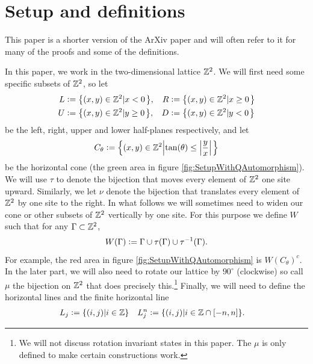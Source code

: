 \documentclass[11pt,a4paper,twoside]{article}
\numberwithin{equation}{section}
\begin{document}
	\section{Setup and definitions}\label{sec:Setup}
	\begin{remark}
		This paper is a shorter version of the ArXiv paper \cite{jappens2023spt} and will often refer to it for many of the proofs and some of the definitions.
	\end{remark}
	In this paper, we work in the two-dimensional lattice $\mathbb Z^2$. We will first need some specific subsets of $\mathbb Z^2$, so let
	\begin{align}
		L&\defeq \left\{(x,y)\in\ZZ^2\left|x<0\right.\right\},&R&\defeq \left\{(x,y)\in\ZZ^2\left|x\geq 0\right.\right\}\\
		U&\defeq \left\{(x,y)\in\ZZ^2\left|y\geq 0\right.\right\},&D&\defeq \left\{(x,y)\in\ZZ^2\left|y<0\right.\right\}
	\end{align}
	be the left, right, upper and lower half-planes respectively, and let
	\begin{equation}
		C_\theta\defeq \left\{(x,y)\in\ZZ^2\left|\tan(\theta)\leq\abs{\frac{y}{x}}\right.\right\}
	\end{equation}
	be the horizontal cone (the green area in figure \ref{fig:SetupWithQAutomorphism}). We will use $\tau$ to denote the bijection that moves every element of $\mathbb Z^2$ one site upward. Similarly, we let $\nu$ denote the bijection that translates every element of $\mathbb Z^2$ by one site to the right. In what follows we will sometimes need to widen our cone or other subsets of $\mathbb Z^2$ vertically by one site. For this purpose we define $W$ such that for any $\Gamma\subset\mathbb Z^2$,
	\begin{equation}
		W(\Gamma)\vcentcolon= \Gamma\cup\tau(\Gamma)\cup\tau^{-1}(\Gamma).
	\end{equation}
	For example, the red area in figure \ref{fig:SetupWithQAutomorphism} is $W(C_\theta)^c$. In the later part, we will also need to rotate our lattice by $90^\circ$ (clockwise) so call $\mu$ the bijection on $\mathbb Z^2$ that does precisely this.\footnote{We will not discuss rotation invariant states in this paper. The $\mu$ is only defined to make certain constructions work.} Finally, we will need to define the horizontal lines and the finite horizontal line
	\begin{align}
		L_j&\vcentcolon= \{(i,j)|i\in\mathbb Z\}&L_j^n&\vcentcolon= \{(i,j)|i\in\mathbb Z\cap[-n,n]\}.
	\end{align}
\end{document}
